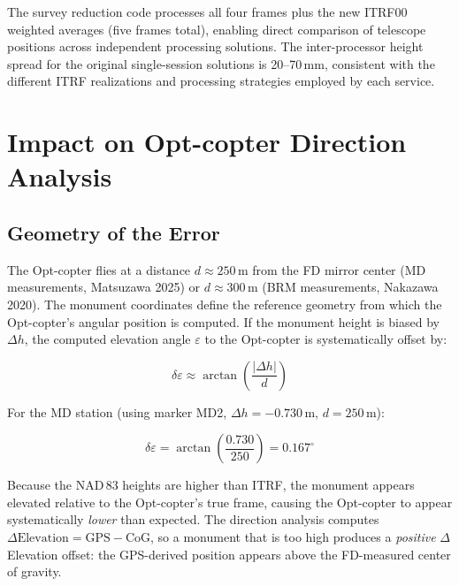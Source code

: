 \documentclass[11pt,letterpaper]{article}
\newcommand{\degree}{^\circ}
\begin{document}
The survey reduction code processes all four frames plus the new ITRF00 weighted averages (five frames total), enabling direct comparison of telescope positions across independent processing solutions. The inter-processor height spread for the original single-session solutions is 20--70\,mm, consistent with the different ITRF realizations and processing strategies employed by each service.

\section{Impact on Opt-copter Direction Analysis}

\subsection{Geometry of the Error}

The Opt-copter flies at a distance $d \approx 250$\,m from the FD mirror center (MD measurements, Matsuzawa 2025) or $d \approx 300$\,m (BRM measurements, Nakazawa 2020). The monument coordinates define the reference geometry from which the Opt-copter's angular position is computed. If the monument height is biased by $\Delta h$, the computed elevation angle $\varepsilon$ to the Opt-copter is systematically offset by:

\begin{equation}
\delta\varepsilon \approx \arctan\!\left(\frac{|\Delta h|}{d}\right)
\label{eq:elevation_error}
\end{equation}

\noindent For the MD station (using marker MD2, $\Delta h = -0.730$\,m, $d = 250$\,m):

\begin{equation}
\delta\varepsilon = \arctan\!\left(\frac{0.730}{250}\right) = 0.167\degree
\end{equation}

\noindent Because the NAD\,83 heights are higher than ITRF, the monument appears elevated relative to the Opt-copter's true frame, causing the Opt-copter to appear systematically \emph{lower} than expected. The direction analysis computes $\Delta\text{Elevation} = \text{GPS} - \text{CoG}$, so a monument that is too high produces a \emph{positive} $\Delta$Elevation offset: the GPS-derived position appears above the FD-measured center of gravity.
\end{document}
